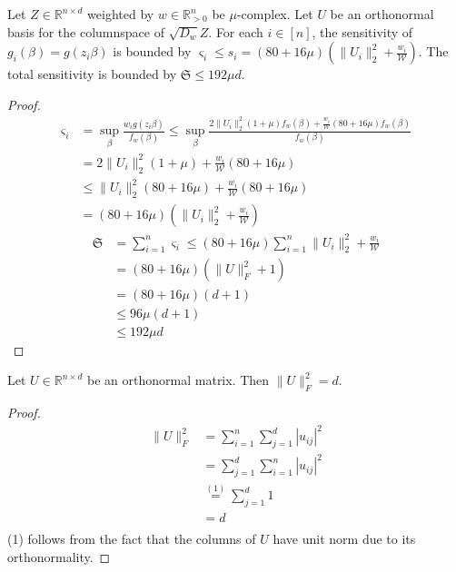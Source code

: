 \begin{lemma}
    Let $Z \in \mathbb{R}^{n \times d}$ weighted by $w \in \mathbb{R}^n_{>0}$
    be $\mu$-complex. Let $U$ be an orthonormal basis for the columnspace
    of $\sqrt{D_w} Z$. 
    For each $i \in [n]$, the sensitivity of $g_i(\beta) = g(z_i \beta)$
    is bounded by 
    $\varsigma_i \leq s_i = (80 + 16\mu)(\lVert U_i \rVert_2^2 + \frac{w_i}{\mathcal{W}})$.
    The total sensitivity is bounded by $\mathfrak{S} \leq 192 \mu d$.
\end{lemma}
\begin{proof}
    \begin{align*}
        \varsigma_i 
         & = \sup_{\beta} \frac{w_i g(z_i \beta)}{f_w(\beta)}
        \leq \sup_{\beta} \frac{2 \lVert U_i \rVert_2^2 (1 + \mu) f_w(\beta)
            + \frac{w_i}{\mathcal{W}} (80 + 16 \mu) f_w(\beta)}{f_w(\beta)}                  \\
         & = 2 \lVert U_i \rVert_2^2 (1 + \mu) + \frac{w_i}{\mathcal{W}} (80 + 16 \mu)       \\
         & \leq \lVert U_i \rVert_2^2 (80 + 16 \mu) +  \frac{w_i}{\mathcal{W}} (80 + 16 \mu) \\
         & = (80 + 16\mu)(\lVert U_i \rVert_2^2 + \frac{w_i}{\mathcal{W}})
    \end{align*}
    \begin{align*}
        \mathfrak{S}
         & = \sum_{i=1}^n \varsigma_i \leq (80 + 16\mu) \sum_{i=1}^n \lVert U_i \rVert_2^2 + \frac{w_i}{\mathcal{W}} \\
         & = (80 + 16 \mu)(\lVert U \rVert_F^2 + 1)                                                                  \\
         & = (80 + 16 \mu)(d + 1)                                                                                    \\
         & \leq 96 \mu(d + 1)                                                                                        \\
         & \leq 192 \mu d
    \end{align*}
\end{proof}

\begin{lemma}
    Let $U \in \mathbb{R}^{n \times d}$ be an orthonormal matrix.
    Then $\lVert U \rVert_F^2 = d$.
\end{lemma}
\begin{proof}
    \begin{align*}
        \lVert U \rVert_F^2 
         & = \sum_{i=1}^n \sum_{j=1}^d |u_{ij}|^2 \\
         & = \sum_{j=1}^d \sum_{i=1}^n |u_{ij}|^2 \\
         & \overset{(1)}{=} \sum_{j=1}^d 1        \\
         & = d                                    \\
    \end{align*}
    (1) follows from the fact that the columns of $U$ have unit norm 
    due to its orthonormality.
\end{proof}
